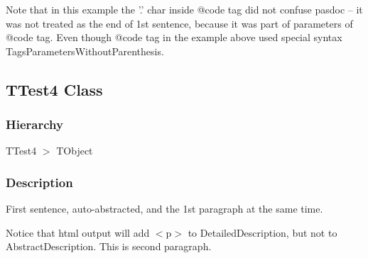 \documentclass{report}
\begin{document}
Note that in this example the '.' char inside @code tag did not confuse pasdoc -- it was not treated as the end of 1st sentence, because it was part of parameters of @code tag. Even though @code tag in the example above used special syntax TagsParametersWithoutParenthesis.\subsection*{TTest4 Class}
\subsubsection*{\large{\textbf{Hierarchy}}\normalsize\hspace{1ex}\hfill}
TTest4 {$>$} TObject
\subsubsection*{\large{\textbf{Description}}\normalsize\hspace{1ex}\hfill}
First sentence, auto{-}abstracted, and the 1st paragraph at the same time.

Notice that html output will add {$<$}p{$>$} to DetailedDescription, but not to AbstractDescription. This is second paragraph.
\end{document}
